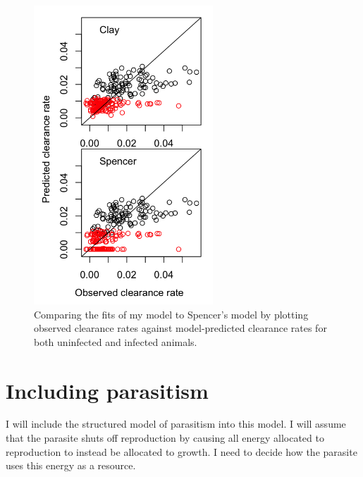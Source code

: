 \documentclass[12pt,reqno,final,pdftex]{amsart}\usepackage[]{graphicx}\usepackage[]{color}
\newenvironment{knitrout}{}{} %
\theoremstyle{plain}
\numberwithin{equation}{part}
\begin{document}
\begin{knitrout}\scriptsize
{}\color{fgcolor}\begin{figure}

\includegraphics[width=0.6\textwidth]{figure/Clay-vs-Spencer-1} \hfill{}

\caption[Comparing the fits of my model to Spencer's model by plotting observed clearance rates against model-predicted clearance rates for both uninfected and infected animals]{Comparing the fits of my model to Spencer's model by plotting observed clearance rates against model-predicted clearance rates for both uninfected and infected animals.}\label{fig:Clay-vs-Spencer}
\end{figure}


\end{knitrout}


\clearpage
\section*{Including parasitism}
I will include the structured model of parasitism into this model.
I will assume that the parasite shuts off reproduction by causing all energy allocated to reproduction to instead be allocated to growth.
I need to decide how the parasite uses this energy as a resource.
\end{document}
